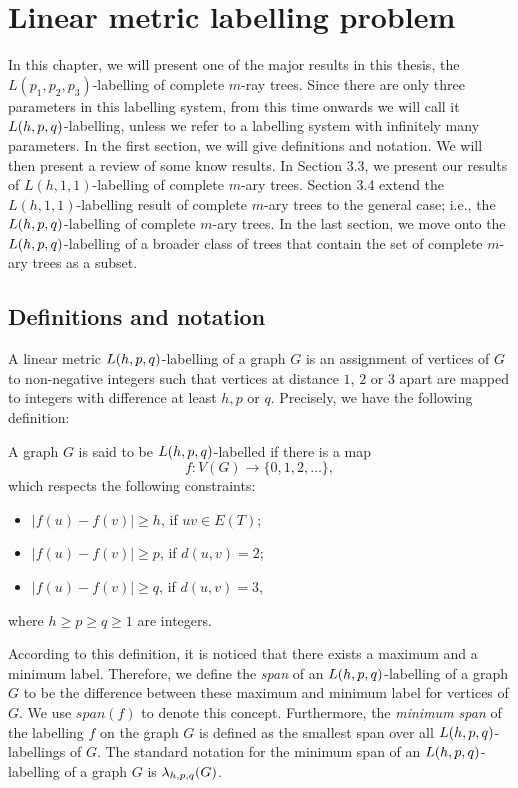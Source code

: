 \chapter{Linear metric labelling problem}

In this chapter, we will present one of the major results in this thesis, the $L(p_1,p_2,p_3)$-labelling of complete $m$-ray trees. Since there are only three parameters in this labelling system, from this time onwards we will call it $L(h,p,q)$-labelling, unless we refer to a labelling system with infinitely many parameters. In the first section, we will give definitions and notation. We will then present a review of some know results. In Section 3.3, we present our results of $L(h,1,1)$-labelling of complete $m$-ary trees. Section 3.4 extend the $L(h,1,1)$-labelling result of complete $m$-ary trees to the general case; i.e., the $L(h,p,q)$-labelling of complete $m$-ary trees. In the last section, we move onto the $L(h,p,q)$-labelling of a broader class of trees that contain the set of complete $m$-ary trees as a subset. 



\section{Definitions and notation}

A linear metric $L(h,p,q)$-labelling of a graph $G$ is an assignment of vertices of $G$ to non-negative integers such that vertices at distance $1$, $2$ or $3$ apart are mapped to integers with difference at least $h, p$ or $q$. Precisely, we have the following definition: 
\begin{definition}
A graph $G$ is said to be $L(h,p,q)$-labelled if there is a map  
\[
f : V(G) \rightarrow \{0, 1, 2, \dots\}, 
\]
which respects the following constraints: 
\begin{itemize}
\item $|f(u) - f(v)| \ge h$, if $uv \in E(T)$;
\item $|f(u) -f(v)| \ge p$, if $d(u,v) = 2$;
\item $|f(u) - f(v)| \ge q$, if $d(u,v)=3$,
\end{itemize}
where $h\ge p \ge q \ge 1$ are integers. 
\end{definition}

According to this definition, it is noticed that there exists a maximum and a minimum label. Therefore, we define the \textit{span} of an $L(h,p,q)$-labelling of a graph $G$ to be the difference between these maximum and minimum label for vertices of $G$. We use $span(f)$ to denote this concept. Furthermore, the {\it{minimum span}} of the labelling $f$ on the graph $G$ is defined as the smallest span over all $L(h,p,q)$-labellings of $G$. The standard notation for the minimum span of an $L(h,p,q)$-labelling of a graph $G$ is $\lambda_{h,p,q}(G)$.

